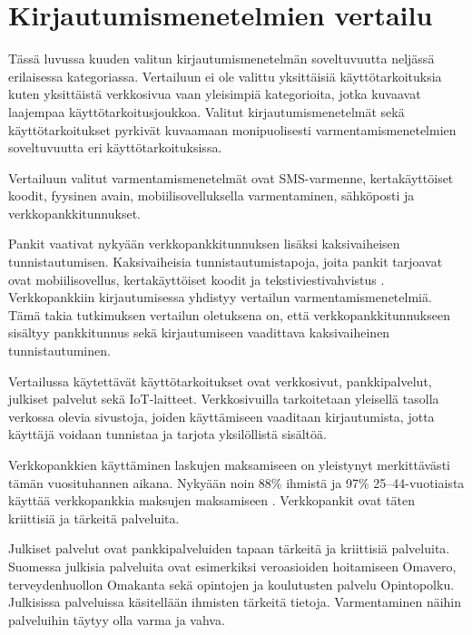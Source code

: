 \chapter{Kirjautumismenetelmien vertailu\label{vertailu}}

Tässä luvussa kuuden valitun kirjautumismenetelmän soveltuvuutta neljässä erilaisessa kategoriassa. Vertailuun ei ole valittu yksittäisiä käyttötarkoituksia kuten yksittäistä verkkosivua vaan yleisimpiä kategorioita, jotka kuvaavat laajempaa käyttötarkoitusjoukkoa. Valitut kirjautumismenetelmät sekä käyttötarkoitukset pyrkivät kuvaamaan monipuolisesti varmentamismenetelmien soveltuvuutta eri käyttötarkoituksissa. 

Vertailuun valitut varmentamismenetelmät ovat SMS-varmenne, kertakäyttöiset koodit, fyysinen avain, mobiilisovelluksella varmentaminen, sähköposti ja verkkopankkitunnukset.

Pankit vaativat nykyään verkkopankkitunnuksen lisäksi kaksivaiheisen tunnistautumisen. Kaksivaiheisia tunnistautumistapoja, joita pankit tarjoavat ovat mobiilisovellus, kertakäyttöiset koodit ja tekstiviestivahvistus \citep{nordea_tunnistautuminen} \citep{op_tunnistautuminen} \citep{spankki_tunnistautuminen}. Verkkopankkiin kirjautumisessa yhdistyy vertailun varmentamismenetelmiä. Tämä takia tutkimuksen vertailun oletuksena on, että verkkopankkitunnukseen sisältyy pankkitunnus sekä kirjautumiseen vaadittava kaksivaiheinen tunnistautuminen.

Vertailussa käytettävät käyttötarkoitukset ovat verkkosivut, pankkipalvelut, julkiset palvelut sekä IoT-laitteet. Verkkosivuilla tarkoitetaan yleisellä tasolla verkossa olevia sivustoja, joiden käyttämiseen vaaditaan kirjautumista, jotta käyttäjä voidaan tunnistaa ja tarjota yksilöllistä sisältöä. 

Verkkopankkien käyttäminen laskujen maksamiseen on yleistynyt merkittävästi tämän vuosituhannen aikana. Nykyään noin 88\% ihmistä ja 97\% 25–44-vuotiaista käyttää verkkopankkia maksujen maksamiseen \citep{säästäminen_luotonkäyttö_maksutavat}. Verkkopankit ovat täten kriittisiä ja tärkeitä palveluita.

Julkiset palvelut ovat pankkipalveluiden tapaan tärkeitä ja kriittisiä palveluita. Suomessa julkisia palveluita ovat esimerkiksi veroasioiden hoitamiseen Omavero, terveydenhuollon Omakanta sekä opintojen ja koulutusten palvelu Opintopolku. Julkisissa palveluissa käsitellään ihmisten tärkeitä tietoja. Varmentaminen näihin palveluihin täytyy olla varma ja vahva.

